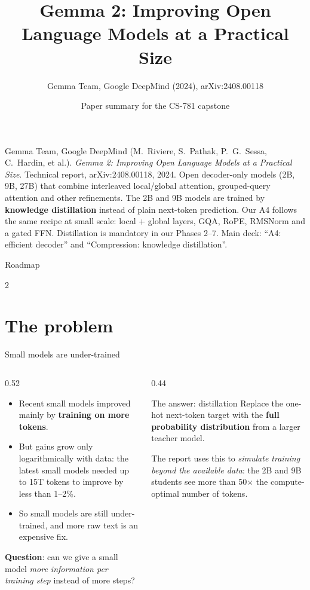\documentclass[aspectratio=169,11pt]{beamer}
\title[Gemma 2]{Gemma 2: Improving Open Language Models at a Practical Size}
\subtitle{Gemma Team, Google DeepMind (2024), arXiv:2408.00118}
\author[Paper summary]{Paper summary for the CS-781 capstone}
\date{}
\begin{document}
\begin{frame}\titlepage\end{frame}

\paperglance
{Gemma Team, Google DeepMind (M.\ Riviere, S.\ Pathak, P.\ G.\ Sessa, C.\ Hardin, et al.). \emph{Gemma 2: Improving Open Language Models at a Practical Size}. Technical report, arXiv:2408.00118, 2024.}
{Open decoder-only models (2B, 9B, 27B) that combine interleaved local/global attention, grouped-query attention and other refinements. The 2B and 9B models are trained by \textbf{knowledge distillation} instead of plain next-token prediction.}
{Our A4 follows the same recipe at small scale: local + global layers, GQA, RoPE, RMSNorm and a gated FFN. Distillation is mandatory in our Phases 2--7.}
{Main deck: ``A4: efficient decoder'' and ``Compression: knowledge distillation''.}

\begin{frame}{Roadmap}
  \begin{multicols}{2}\small\tableofcontents\end{multicols}
\end{frame}

\section{The problem}

\begin{frame}{Small models are under-trained}
  \begin{columns}[T]
    \begin{column}{0.52\textwidth}
      \small
      \begin{itemize}
        \item Recent small models improved mainly by \textbf{training on more tokens}.
        \item But gains grow only logarithmically with data: the latest small models needed up to 15T tokens to improve by less than 1--2\%.
        \item So small models are still under-trained, and more raw text is an expensive fix.
      \end{itemize}
      \vspace{1mm}
      \textbf{Question}: can we give a small model \emph{more information per training step} instead of more steps?
    \end{column}
    \begin{column}{0.44\textwidth}
      \begin{exampleblock}{The answer: distillation}
        \small
        Replace the one-hot next-token target with the \textbf{full probability distribution} from a larger teacher model.
        \vspace{1mm}

        The report uses this to \emph{simulate training beyond the available data}: the 2B and 9B students see more than 50$\times$ the compute-optimal number of tokens.
      \end{exampleblock}
    \end{column}
  \end{columns}
\end{frame}
\end{document}
